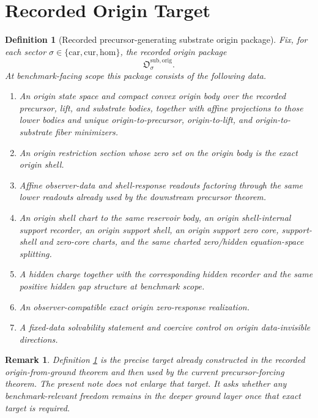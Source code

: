 \documentclass[11pt]{article}
\newcommand{\Car}{\mathrm{car}}
\newcommand{\Cur}{\mathrm{cur}}
\newcommand{\Hom}{\mathrm{hom}}
\newcommand{\OriginPackage}{\mathfrak O^{\mathrm{sub,orig}}}
\newtheorem{definition}{Definition}
\newtheorem{remark}{Remark}
\begin{document}
\section{Recorded Origin Target}

\begin{definition}[Recorded precursor-generating substrate origin package]
\label{def:orig}
Fix, for each sector \(\sigma\in\{\Car,\Cur,\Hom\}\), the recorded origin package
\[
\OriginPackage_{\sigma}.
\]
At benchmark-facing scope this package consists of the following data.
\begin{enumerate}
    \item An origin state space and compact convex origin body over the recorded precursor, lift, and substrate bodies, together with affine projections to those lower bodies and unique origin-to-precursor, origin-to-lift, and origin-to-substrate fiber minimizers.
    \item An origin restriction section whose zero set on the origin body is the exact origin shell.
    \item Affine observer-data and shell-response readouts factoring through the same lower readouts already used by the downstream precursor theorem.
    \item An origin shell chart to the same reservoir body, an origin shell-internal support recorder, an origin support shell, an origin support zero core, support-shell and zero-core charts, and the same charted zero/hidden equation-space splitting.
    \item A hidden charge together with the corresponding hidden recorder and the same positive hidden gap structure at benchmark scope.
    \item An observer-compatible exact origin zero-response realization.
    \item A fixed-data solvability statement and coercive control on origin data-invisible directions.
\end{enumerate}
\end{definition}

\begin{remark}
Definition \ref{def:orig} is the precise target already constructed in the recorded origin-from-ground theorem and then used by the current precursor-forcing theorem. The present note does not enlarge that target. It asks whether any benchmark-relevant freedom remains in the deeper ground layer once that exact target is required.
\end{remark}
\end{document}
